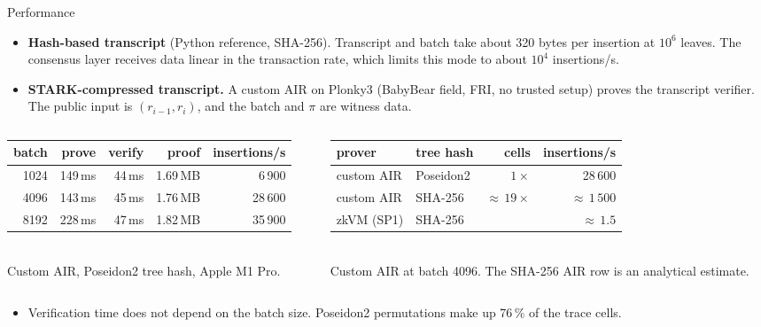 \documentclass[aspectratio=169,10pt]{beamer}
\begin{document}
\begin{frame}{Performance}
\small
\begin{itemize}
  \item \textbf{Hash-based transcript} (Python reference, SHA-256). Transcript and batch take about 320 bytes per insertion at $10^6$ leaves. The consensus layer receives data linear in the transaction rate, which limits this mode to about $10^4$ insertions/s.
  \item \textbf{STARK-compressed transcript.} A custom AIR on Plonky3 (BabyBear field, FRI, no trusted setup) proves the transcript verifier. The public input is $(r_{i-1}, r_i)$, and the batch and $\pi$ are witness data.
\end{itemize}

\vspace{1mm}
\begin{columns}[T]
\begin{column}{0.48\textwidth}
\centering\footnotesize
\begin{tabular}{@{}rrrrr@{}}
\toprule
batch & prove & verify & proof & insertions/s \\
\midrule
1024 & 149\,ms & 44\,ms & 1.69\,MB & 6\,900 \\
4096 & 143\,ms & 45\,ms & 1.76\,MB & 28\,600 \\
8192 & 228\,ms & 47\,ms & 1.82\,MB & 35\,900 \\
\bottomrule
\end{tabular}\\[1mm]
\scriptsize Custom AIR, Poseidon2 tree hash, Apple M1 Pro.
\end{column}
\begin{column}{0.48\textwidth}
\centering\footnotesize
\begin{tabular}{@{}llrr@{}}
\toprule
prover & tree hash & cells & insertions/s \\
\midrule
custom AIR & Poseidon2 & $1\times$ & 28\,600 \\
custom AIR & SHA-256 & ${\approx}\,19\times$ & ${\approx}\,1\,500$ \\
zkVM (SP1) & SHA-256 & & ${\approx}\,1.5$ \\
\bottomrule
\end{tabular}\\[1mm]
\scriptsize Custom AIR at batch 4096. The SHA-256 AIR row is an analytical estimate.
\end{column}
\end{columns}

\vspace{2mm}
\begin{itemize}
  \item Verification time does not depend on the batch size. Poseidon2 permutations make up 76\,\% of the trace cells.
\end{itemize}
\end{frame}
\end{document}
